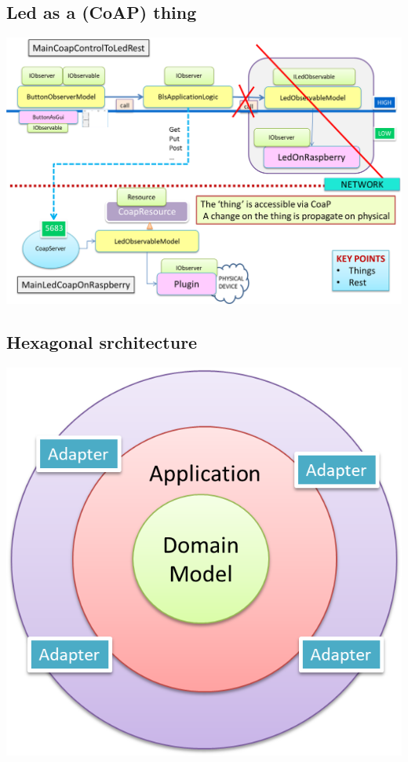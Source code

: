 \documentclass[10pt,a4paper,openright,twoside]{C:/Didattica/git/lab2014Bo/it.unibo.iss2015intro/docsInternal/contents/llncs}
\begin{document}


\subsection{Led as a (CoAP) thing }

\medskip 
\includegraphics[scale = 0.5]{img/bls18/bls18CoapBL.png}


\subsection{Hexagonal srchitecture}
\medskip 
\includegraphics[scale = 0.5]{img/hex1.png}
\end{document}
